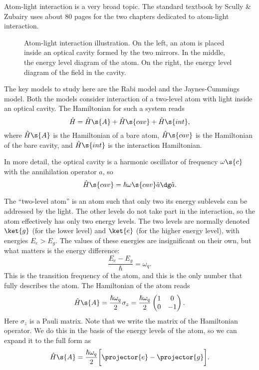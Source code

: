 \documentclass[fontsize=9pt,twoside=semi,bookmarkpackage=false]{scrartcl}
\renewcommand{\hbar}{\hslash}
\newcommand{\inputtikz}[1]{%
  \tikzsetnextfilename{#1}%
}
\begin{document}
Atom-light interaction is a very broad topic.
The standard textbook by Scully \& Zubairy uses about 80 pages for the two chapters dedicated to atom-light interaction.

\begin{figure}[htb]%
  \centering
  \inputtikz{atom-cavity}
  \caption{Atom-light interaction illustration.
    On the left, an atom is placed inside an optical cavity formed by the two mirrors.
    In the middle, the energy level diagram of the atom.
  On the right, the energy level diagram of the field in the cavity.}
  \label{fig:atom:light:int}
\end{figure}%

The key models to study here are the Rabi model and the Jaynes-Cummings model.
Both the models consider interaction of a two-level atom with light inside an optical cavity.
The Hamiltonian for such a system reads
\begin{equation}
  \hat H = \hat H\s{A} + \hat H\s{cav} + \hat H\s{int},
\end{equation}
where $\hat H\s{A}$ is the Hamiltonian of a bare atom,
$\hat H\s{cav}$ is the Hamiltonian of the bare cavity, and $\hat H\s{int}$ is the interaction Hamiltonian.

In more detail, the optical cavity is a harmonic oscillator of frequency $\omega\s{c}$ with the annihilation operator $\hat a$, so
\begin{equation}
  \hat H\s{cav} = \hbar \omega\s{cav} \hat a\dg \hat a.
\end{equation}

The ``two-level atom'' is an atom such that only two its energy sublevels can be addressed by the light.
The other levels do not take part in the interaction, so the atom effectively has only two energy levels.
The two levels are normally denoted $\ket{g}$ (for the lower level) and $\ket{e}$ (for the higher energy level), with energies $E_e > E_g$.
The values of these energies are insignificant on their own, but what matters is the energy difference:
\begin{equation}
  \frac{ E_e - E_g }{ \hbar } = \omega_q.
\end{equation}
This is the transition frequency of the atom, and this is the only number that fully describes the atom.
The Hamiltonian of the atom reads
\begin{equation}
  \hat H\s{A}
  = \frac{ \hbar \omega_q }{ 2 } \sigma_z
  = \frac{ \hbar \omega_q }{ 2 }
  \begin{pmatrix}
    1 & 0 \\ 0 & - 1
  \end{pmatrix}.
\end{equation}
Here $\sigma_z$ is a Pauli matrix.
Note that we write the matrix of the Hamiltonian operator.
We do this in the basis of the energy levels of the atom, so we can expand it to the full form as
\begin{equation}
  \hat H\s{A}
  = \frac{ \hbar \omega_q }{ 2 }
  \bigg[ \projector{e} -  \projector{g} \bigg].
\end{equation}
\end{document}
